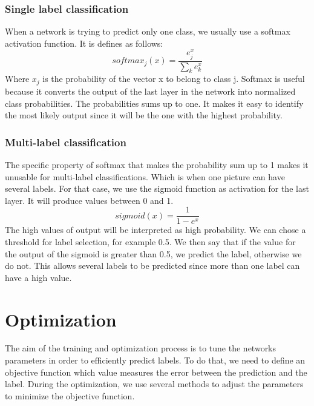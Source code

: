 \subsubsection{Single label classification}
When a network is trying to predict only one class, we usually use a softmax activation function. It is defines as follows: \[softmax_j(x) = \frac{e^x_{j}}{\sum\nolimits_{k} e^x_{k}} \] Where \(x_j\) is the probability of the vector x to belong to class j. Softmax is useful because it converts the output of the last layer in the network into normalized class probabilities. The probabilities sums up to one. It makes it easy to identify the most likely output since it will be the one with the highest probability. 
\subsubsection{Multi-label classification}
The specific property of softmax that makes the probability sum up to 1 makes it unusable for multi-label classifications. Which is when one picture can have several labels. For that case, we use the sigmoid function as activation for the last layer. It will produce values between 0 and 1.
\[sigmoid(x) = \frac{1}{1 - e^x} \]
The high values of output will be interpreted as high probability. We can chose a threshold for label selection, for example 0.5. We then say that if the value for the output of the sigmoid is greater than 0.5, we predict the label, otherwise we do not. This allows several labels to be predicted since more than one label can have a high value. 

\section{Optimization}
The aim of the training and optimization process is to tune the networks parameters in order to efficiently predict labels. To do that, we need to define an objective function which value measures the error between the prediction and the label. During the optimization, we use several methods to adjust the parameters to minimize the objective function.

